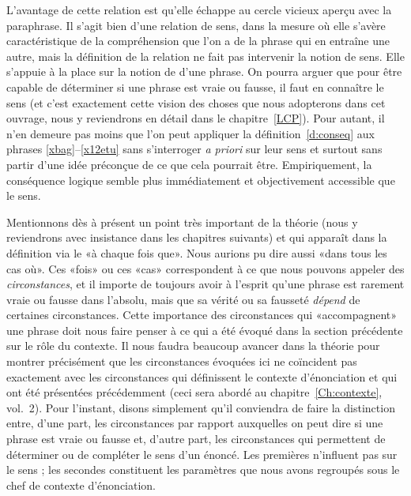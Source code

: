 \begin{refsegment}
L'avantage de cette relation est qu'elle échappe au cercle vicieux
aperçu avec la paraphrase.  Il s'agit bien d'une relation de sens,
dans la mesure où elle s'avère caractéristique de la compréhension
que l'on a de la phrase qui en entraîne une autre, mais la définition
de la relation ne fait pas intervenir la notion de sens.  Elle
s'appuie à la place sur la notion de  d'une phrase.  On
pourra arguer que pour être capable de déterminer si une phrase est
vraie ou fausse, il faut en connaître le sens (et c'est exactement
cette vision des choses que nous adopterons dans cet ouvrage, nous y
reviendrons en détail dans le chapitre~\ref{LCP}).  Pour autant, il
n'en demeure pas moins que l'on peut appliquer la
définition~\ref{d:conseq} aux phrases \ref{xbag}--\ref{x12etu} sans
s'interroger \emph{a priori} sur leur sens et surtout sans partir d'une idée
préconçue de ce que cela pourrait être.  
Empiriquement, la
conséquence logique semble plus immédiatement et objectivement accessible que le sens.


\newpage

Mentionnons dès à présent un point très important de la théorie (nous
y reviendrons avec insistance dans les chapitres suivants) et qui 
apparaît dans la définition via le «à chaque fois que».  Nous
aurions pu dire aussi «dans tous les cas où».  Ces «fois»
ou ces «cas» correspondent à ce que nous pouvons appeler des
\emph{circonstances}, et il importe de toujours avoir à l'esprit
qu'une phrase est rarement vraie ou fausse dans l'absolu, mais que sa
vérité ou sa fausseté \emph{dépend} de certaines circonstances.  Cette
importance des circonstances qui «accompagnent» une phrase doit
nous faire penser à ce qui a été évoqué dans la section précédente sur
le rôle du contexte.  Il nous faudra beaucoup avancer dans la théorie
pour montrer précisément que les circonstances évoquées ici ne
coïncident pas exactement avec les circonstances qui définissent le
contexte d'énonciation et qui ont été présentées précédemment (ceci
sera abordé au chapitre~\ref{Ch:contexte}, vol.~2).  Pour l'instant, disons
simplement qu'il conviendra de faire la distinction entre, d'une part, les circonstances par
rapport auxquelles on peut dire si une phrase est vraie ou fausse et, d'autre part, les
circonstances qui permettent de déterminer ou de compléter le sens
d'un énoncé.  Les premières n'influent pas sur le sens ; les secondes
constituent les paramètres que nous avons regroupés sous le chef de
contexte d'énonciation. 



\end{refsegment}
